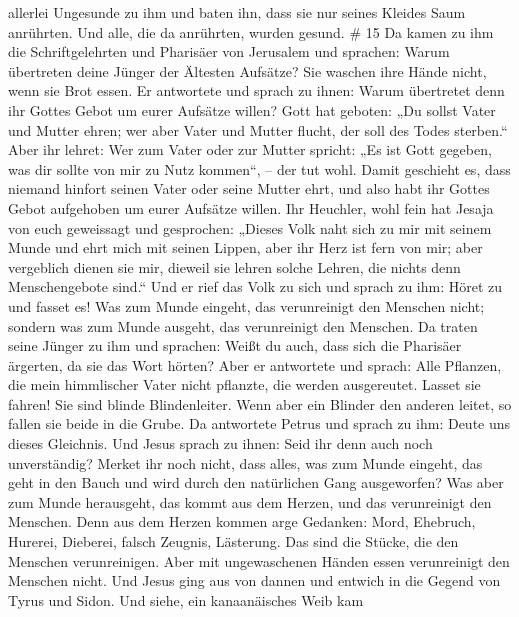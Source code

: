 allerlei Ungesunde zu ihm  und baten ihn, dass sie nur
seines Kleides Saum anrührten. Und alle, die da anrührten, wurden
gesund. \# 15  Da kamen zu ihm die Schriftgelehrten und
Pharisäer von Jerusalem und sprachen:  Warum übertreten
deine Jünger der Ältesten Aufsätze? Sie waschen ihre Hände nicht, wenn
sie Brot essen.  Er antwortete und sprach zu ihnen: Warum
übertretet denn ihr Gottes Gebot um eurer Aufsätze willen? 
Gott hat geboten: „Du sollst Vater und Mutter ehren; wer aber Vater und
Mutter flucht, der soll des Todes sterben.``  Aber ihr
lehret: Wer zum Vater oder zur Mutter spricht: „Es ist Gott gegeben, was
dir sollte von mir zu Nutz kommen``, -- der tut wohl.  Damit
geschieht es, dass niemand hinfort seinen Vater oder seine Mutter ehrt,
und also habt ihr Gottes Gebot aufgehoben um eurer Aufsätze willen.
 Ihr Heuchler, wohl fein hat Jesaja von euch geweissagt und
gesprochen:  „Dieses Volk naht sich zu mir mit seinem Munde
und ehrt mich mit seinen Lippen, aber ihr Herz ist fern von mir;
 aber vergeblich dienen sie mir, dieweil sie lehren solche
Lehren, die nichts denn Menschengebote sind.``  Und er rief
das Volk zu sich und sprach zu ihm: Höret zu und fasset es!
 Was zum Munde eingeht, das verunreinigt den Menschen
nicht; sondern was zum Munde ausgeht, das verunreinigt den Menschen.
 Da traten seine Jünger zu ihm und sprachen: Weißt du auch,
dass sich die Pharisäer ärgerten, da sie das Wort hörten? 
Aber er antwortete und sprach: Alle Pflanzen, die mein himmlischer Vater
nicht pflanzte, die werden ausgereutet.  Lasset sie fahren!
Sie sind blinde Blindenleiter. Wenn aber ein Blinder den anderen leitet,
so fallen sie beide in die Grube.  Da antwortete Petrus und
sprach zu ihm: Deute uns dieses Gleichnis.  Und Jesus
sprach zu ihnen: Seid ihr denn auch noch unverständig? 
Merket ihr noch nicht, dass alles, was zum Munde eingeht, das geht in
den Bauch und wird durch den natürlichen Gang ausgeworfen? 
Was aber zum Munde herausgeht, das kommt aus dem Herzen, und das
verunreinigt den Menschen.  Denn aus dem Herzen kommen arge
Gedanken: Mord, Ehebruch, Hurerei, Dieberei, falsch Zeugnis, Lästerung.
 Das sind die Stücke, die den Menschen verunreinigen. Aber
mit ungewaschenen Händen essen verunreinigt den Menschen nicht.
 Und Jesus ging aus von dannen und entwich in die Gegend
von Tyrus und Sidon.  Und siehe, ein kanaanäisches Weib kam
